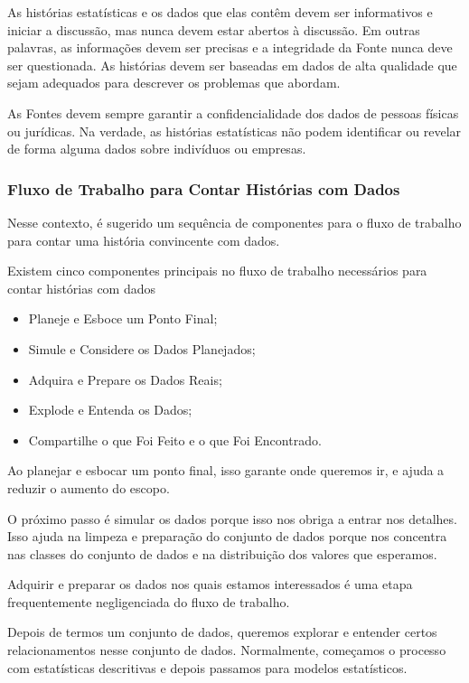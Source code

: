  As histórias estatísticas e os dados que elas contêm devem ser informativos e iniciar a discussão, mas nunca devem estar abertos à discussão. Em outras palavras, as informações devem ser precisas e a integridade da Fonte nunca deve ser questionada. As histórias devem ser baseadas em dados de alta qualidade que sejam adequados para descrever os problemas que abordam.\vskip0.3cm 


 As Fontes devem sempre garantir a confidencialidade dos dados de pessoas físicas ou jurídicas. Na verdade, as histórias estatísticas não podem identificar ou revelar de forma alguma dados sobre indivíduos ou empresas.



 
\newpage
\subsubsection{Fluxo de Trabalho para Contar Histórias com Dados}

Nesse contexto, é sugerido um sequência de componentes para o fluxo de trabalho para contar uma história convincente com dados.\vskip0.3cm

Existem cinco componentes principais no fluxo de trabalho necessários para contar histórias com dados

\begin{itemize}
\item[{a)}] Planeje e Esboce um Ponto Final;
\item[{b)}] Simule e Considere os Dados Planejados;
\item[{c)}] Adquira e Prepare os Dados Reais;
\item[{d)}] Explode e Entenda os Dados;
\item[{e)}] Compartilhe o que Foi Feito e o que Foi Encontrado.
\end{itemize}

Ao planejar e esbocar um ponto final, isso garante onde queremos ir, e ajuda a reduzir o aumento do escopo.\vskip0.3cm

O próximo passo é simular os dados porque isso nos obriga a entrar nos detalhes. Isso ajuda na limpeza e preparação do conjunto de dados porque nos concentra nas classes do conjunto de dados e na distribuição dos valores que esperamos.\vskip0.3cm

Adquirir e preparar os dados nos quais estamos interessados ​​é uma etapa frequentemente negligenciada do fluxo de trabalho. \vskip0.3cm

Depois de termos um conjunto de dados, queremos explorar e entender certos relacionamentos nesse conjunto de dados. Normalmente, começamos o processo com estatísticas descritivas e depois passamos para modelos estatísticos.\vskip0.3cm

